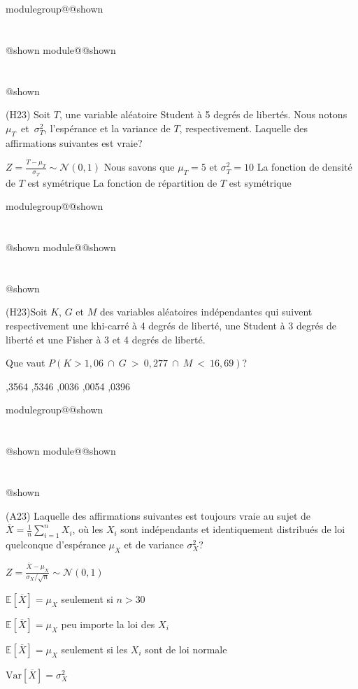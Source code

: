 \documentclass{Evaluation}
\makeatletter
\newcommand{\currentmodulekey}{}
\newcommand{\currentmoduletitle}{}
\newcommand{\currentgroupkey}{}
\newcommand{\currentgrouptitle}{}
\newcommand{\showmoduleifneeded}{%
  \ifx\currentgroupkey\empty\else
    \expandafter\ifx\csname modulegroup@\currentgroupkey @shown\endcsname\relax
      \section*{\currentgrouptitle}%
      \expandafter\gdef\csname modulegroup@\currentgroupkey @shown\endcsname{1}%
    \fi
  \fi
  \expandafter\ifx\csname module@\currentmodulekey @shown\endcsname\relax
    \section*{\currentmoduletitle}%
    \expandafter\gdef\csname module@\currentmodulekey @shown\endcsname{1}%
  \fi
}
\newenvironment{H23}{\showmoduleifneeded}{}
\newenvironment{A23}{\showmoduleifneeded}{}
\makeatother
\begin{document}
\begin{questions}
\begin{H23}
\question (H23) Soit $T$, une variable aléatoire Student à 5 degrés de libertés. Nous notons $\mu_T$~et~$\sigma^2_T$, l'espérance et la variance de $T$, respectivement. Laquelle des affirmations suivantes est vraie? %

\begin{checkboxes}
\choice $\displaystyle Z=\frac{T-\mu_T}{\sigma_T}\sim \mathcal{N}(0, 1)$
\choice Nous savons que $\mu_T=5$ et $\sigma^2_T=10$
\CorrectChoice La fonction de densité de $T$ est symétrique
\choice La fonction de répartition de $T$ est symétrique
\end{checkboxes}
\end{H23}

\begin{H23}
\question (H23)Soit $K$, $G$ et $M$ des variables aléatoires indépendantes qui suivent respectivement une khi-carré à 4 degrés de liberté, une Student à 3 degrés de liberté et une Fisher à 3 et 4 degrés de liberté. 

Que vaut $P(K>1,06~\cap~G~>~0,277~\cap~M~<~16,69)$?

\begin{oneparcheckboxes}
		,3564
		,5346
		,0036
		,0054
		,0396
\end{oneparcheckboxes}
\end{H23}

\begin{A23}
\question (A23) Laquelle des affirmations suivantes est toujours vraie au sujet de $\overline{X}=\displaystyle \frac{1}{n}\sum_{i=1}^n X_i$, où les $X_i$ sont indépendants et identiquement distribués de loi quelconque d'espérance $\mu_X$ et de variance $\sigma^2_X$? %

\begin{checkboxes}
\choice $\displaystyle Z=\frac{\overline{X}-\mu_X}{\sigma_X / \sqrt{n}}\sim \mathcal{N}(0, 1)$

\choice $\mathbb{E}\left[\overline{X}\right]=\mu_X$ seulement si $n>30$

\correctchoice $\mathbb{E}\left[\overline{X}\right]=\mu_X$ peu importe la loi des $X_i$

\choice $\displaystyle\mathbb{E}\left[\overline{X}\right]=\mu_X$  seulement si les $X_i$ sont de loi normale

\choice $\text{Var}\left[\overline{X}\right]=\sigma^2_X$
\end{checkboxes}
\end{A23}


\end{questions}
\end{document}
